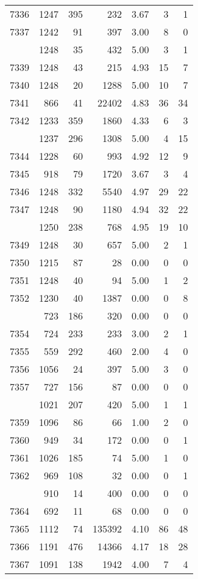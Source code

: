 \documentclass[
]{article}
\begin{document}
\begin{table}
\begin{tabular}[t]{lrrrrrr}
7336 & 1247 & 395 & 232 & 3.67 & 3 & 1\\
7337 & 1242 & 91 & 397 & 3.00 & 8 & 0\\
\addlinespace
7338 & 1248 & 35 & 432 & 5.00 & 3 & 1\\
7339 & 1248 & 43 & 215 & 4.93 & 15 & 7\\
7340 & 1248 & 20 & 1288 & 5.00 & 10 & 7\\
7341 & 866 & 41 & 22402 & 4.83 & 36 & 34\\
7342 & 1233 & 359 & 1860 & 4.33 & 6 & 3\\
\addlinespace
7343 & 1237 & 296 & 1308 & 5.00 & 4 & 15\\
7344 & 1228 & 60 & 993 & 4.92 & 12 & 9\\
7345 & 918 & 79 & 1720 & 3.67 & 3 & 4\\
7346 & 1248 & 332 & 5540 & 4.97 & 29 & 22\\
7347 & 1248 & 90 & 1180 & 4.94 & 32 & 22\\
\addlinespace
7348 & 1250 & 238 & 768 & 4.95 & 19 & 10\\
7349 & 1248 & 30 & 657 & 5.00 & 2 & 1\\
7350 & 1215 & 87 & 28 & 0.00 & 0 & 0\\
7351 & 1248 & 40 & 94 & 5.00 & 1 & 2\\
7352 & 1230 & 40 & 1387 & 0.00 & 0 & 8\\
\addlinespace
7353 & 723 & 186 & 320 & 0.00 & 0 & 0\\
7354 & 724 & 233 & 233 & 3.00 & 2 & 1\\
7355 & 559 & 292 & 460 & 2.00 & 4 & 0\\
7356 & 1056 & 24 & 397 & 5.00 & 3 & 0\\
7357 & 727 & 156 & 87 & 0.00 & 0 & 0\\
\addlinespace
7358 & 1021 & 207 & 420 & 5.00 & 1 & 1\\
7359 & 1096 & 86 & 66 & 1.00 & 2 & 0\\
7360 & 949 & 34 & 172 & 0.00 & 0 & 1\\
7361 & 1026 & 185 & 74 & 5.00 & 1 & 0\\
7362 & 969 & 108 & 32 & 0.00 & 0 & 1\\
\addlinespace
7363 & 910 & 14 & 400 & 0.00 & 0 & 0\\
7364 & 692 & 11 & 68 & 0.00 & 0 & 0\\
7365 & 1112 & 74 & 135392 & 4.10 & 86 & 48\\
7366 & 1191 & 476 & 14366 & 4.17 & 18 & 28\\
7367 & 1091 & 138 & 1942 & 4.00 & 7 & 4\\

\end{tabular}
\end{table}
\end{document}
